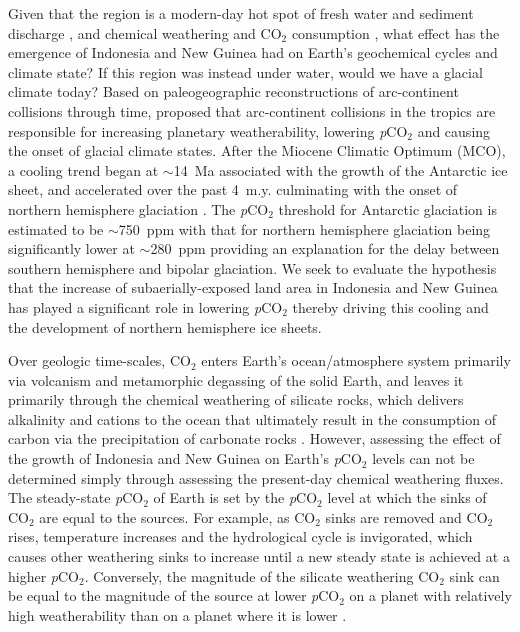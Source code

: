 \documentclass[11pt,letterpaper]{article}
\newcommand{\pCOtwo}{\textit{p}CO$_{2}$\xspace}
\newcommand{\COtwo}{CO$_{2}$\xspace}
\begin{document}
Given that the region is a modern-day hot spot of fresh water and sediment discharge \citep{Milliman2013a}, and chemical weathering and \COtwo consumption \citep{Hartmann2009a}, what effect has the emergence of Indonesia and New Guinea had on Earth's geochemical cycles and climate state? If this region was instead under water, would we have a glacial climate today? Based on paleogeographic reconstructions of arc-continent collisions through time, \citet{Macdonald2019a} proposed that arc-continent collisions in the tropics are responsible for increasing planetary weatherability, lowering \pCOtwo and causing the onset of glacial climate states. After the Miocene Climatic Optimum (MCO), a cooling trend began at $\sim$14~Ma associated with the growth of the Antarctic ice sheet, and accelerated over the past 4~m.y. culminating with the onset of northern hemisphere glaciation \citep{Shackleton1984a, Zachos2001a}. The \pCOtwo threshold for Antarctic glaciation is estimated to be $\sim$750~ppm with that for northern hemisphere glaciation being significantly lower at $\sim$280~ppm \citep{DeConto2008a} providing an explanation for the delay between southern hemisphere and bipolar glaciation. We seek to evaluate the hypothesis that the increase of subaerially-exposed land area in Indonesia and New Guinea has played a significant role in lowering \pCOtwo thereby driving this cooling and the development of northern hemisphere ice sheets.

Over geologic time-scales, \COtwo enters Earth's ocean/atmosphere system primarily via volcanism and metamorphic degassing of the solid Earth, and leaves it primarily through the chemical weathering of silicate rocks, which delivers alkalinity and cations to the ocean that ultimately result in the consumption of carbon via the precipitation of carbonate rocks \citep{Kump2000a}. However, assessing the effect of the growth of Indonesia and New Guinea on Earth's \pCOtwo levels can not be determined simply through assessing the present-day chemical weathering fluxes. The steady-state \pCOtwo of Earth is set by the \pCOtwo level at which the sinks of \COtwo are equal to the sources. For example, as \COtwo sinks are removed and \COtwo rises, temperature increases and the hydrological cycle is invigorated, which causes other weathering sinks to increase until a new steady state is achieved at a higher \pCOtwo. Conversely, the magnitude of the silicate weathering \COtwo sink can be equal to the magnitude of the source at lower \pCOtwo on a planet with relatively high weatherability than on a planet where it is lower \citep{Kump1997a}.
\end{document}
